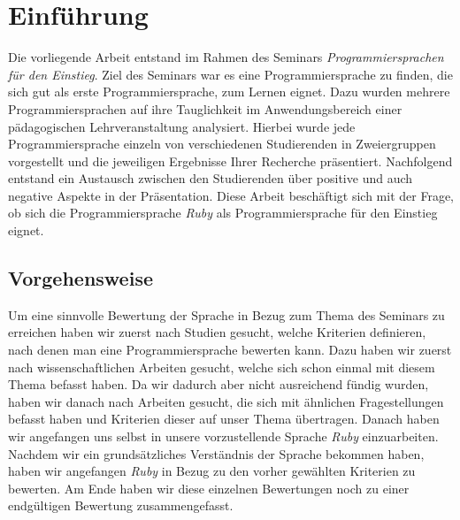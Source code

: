 \documentclass[12pt,DIV=14, version=first, BCOR=10mm,a4paper,twoside,parskip=half-,headsepline,headinclude]{scrartcl}
\begin{document}
\pagebreak

%



\section{Einführung}
\begin{flushleft}
Die vorliegende Arbeit entstand im Rahmen des Seminars \textit{\glqq Programmiersprachen für den Einstieg\grqq}. Ziel des Seminars war es eine Programmiersprache zu finden, die sich gut als erste Programmiersprache, zum Lernen eignet. Dazu wurden mehrere Programmiersprachen auf ihre Tauglichkeit im Anwendungsbereich einer pädagogischen Lehrveranstaltung analysiert. Hierbei wurde jede Programmiersprache einzeln von verschiedenen Studierenden in Zweiergruppen vorgestellt und die jeweiligen Ergebnisse Ihrer Recherche präsentiert. Nachfolgend entstand ein Austausch zwischen den Studierenden über positive und auch negative Aspekte in der Präsentation. Diese Arbeit beschäftigt sich mit der Frage, ob sich die Programmiersprache \textit{\glqq Ruby\grqq} als Programmiersprache für den Einstieg eignet.
\end{flushleft}

\subsection{Vorgehensweise}
\begin{flushleft}
Um eine sinnvolle Bewertung der Sprache in Bezug zum Thema des Seminars zu erreichen haben wir zuerst nach Studien gesucht, welche Kriterien definieren, nach denen man eine Programmiersprache bewerten kann. Dazu haben wir zuerst nach wissenschaftlichen Arbeiten gesucht, welche sich schon einmal mit diesem Thema befasst haben. Da wir dadurch aber nicht ausreichend fündig wurden, haben wir danach nach Arbeiten gesucht, die sich mit ähnlichen Fragestellungen befasst haben und Kriterien dieser auf unser Thema übertragen. Danach haben wir angefangen uns selbst in unsere vorzustellende Sprache \textit{\glqq Ruby\grqq} einzuarbeiten. Nachdem wir ein grundsätzliches Verständnis der Sprache bekommen haben, haben wir angefangen \textit{\glqq Ruby\grqq} in Bezug zu den vorher gewählten Kriterien zu bewerten. Am Ende haben wir diese einzelnen Bewertungen noch zu einer endgültigen Bewertung zusammengefasst.
\end{flushleft}
\end{document}
